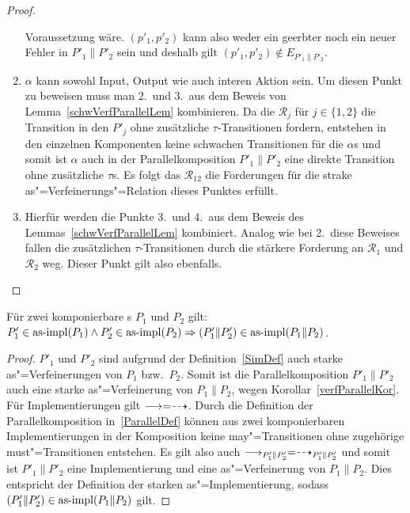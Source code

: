 \begin{proof}
\begin{enumerate}
      Voraussetzung wäre. $(p'_1,p'_2)$ kann also weder ein geerbter noch ein
      neuer Fehler in $P'_1\|P'_2$ sein und deshalb gilt $(p'_1,p'_2) \notin
      E_{P'_1\|P'_2}$.
    \item $\alpha$ kann sowohl Input, Output wie auch interen Aktion sein. Um
      diesen Punkt zu beweisen muss man 2.\ und 3.\ aus dem Beweis von
      Lemma~\ref{schwVerfParallelLem} kombinieren. Da die $\mathcal{R}_j$ für
      $j\in\{1,2\}$ die Transition in den $P'_j$ ohne zusätzliche
      $\tau$-Transitionen fordern, entstehen in den einzelnen Komponenten keine
      schwachen Transitionen für die $\alpha$s und somit ist $\alpha$ auch in
      der Parallelkomposition $P'_1\|P'_2$ eine direkte Transition ohne
      zusätzliche $\tau$s. Es folgt das $\mathcal{R}_{12}$ die Forderungen für
      die strake as"=Verfeinerungs"=Relation dieses Punktes erfüllt.
    \item Hierfür werden die Punkte 3.\ und 4.\ aus dem Beweis des
      Lemmas~\ref{schwVerfParallelLem} kombiniert. Analog wie bei 2.\ diese
      Beweises fallen die zusätzlichen $\tau$-Transitionen durch die stärkere
      Forderung an $\mathcal{R}_1$ und $\mathcal{R}_2$ weg. Dieser Punkt gilt
      also ebenfalls.
  \end{enumerate}
\end{proof}

\begin{Kor}
  \label{ImpParallelKor}
  Für zwei komponierbare \MEIO{}s $P_1$ und $P_2$ gilt:
  $P'_1\in\mathrm{as}\text{-}\mathrm{impl} (P_1) \land P'_2 \in\mathrm{as}\text{-}\mathrm{impl} (P_2) \Rightarrow (P'_1\|P'_2)
  \in\mathrm{as}\text{-}\mathrm{impl} (P_1\|P_2)$.
\end{Kor}
\begin{proof}
  $P'_1$ und $P'_2$ sind aufgrund der Definition~\ref{SimDef} auch starke
  as"=Verfeinerungen von $P_1$ bzw.\ $P_2$. Somit ist die Parallelkomposition
  $P'_1\|P'_2$ auch eine starke as"=Verfeinerung von $P_1\|P_2$, wegen
  Korollar~\ref{verfParallelKor}. Für Implementierungen gilt $\must =\may$.
  Durch die Definition der Parallelkomposition in~\ref{ParallelDef} können
  aus zwei komponierbaren Implementierungen in der Komposition keine
  may"=Transitionen ohne zugehörige must"=Transitionen entstehen. Es gilt also
  auch $\must _{P'_1\|P'_2} =\may _{P'_1\|P'_2}$ und somit ist $P'_1\|P'_2$
  eine Implementierung und eine as"=Verfeinerung von $P_1\|P_2$. Dies
  entspricht der Definition der starken as"=Implementierung, sodass
  $(P'_1\|P'_2)\in\mathrm{as}\text{-}\mathrm{impl} (P_1\|P_2)$ gilt.
\end{proof}

